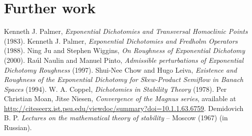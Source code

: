 \documentclass[12pt]{article} %
\theoremstyle{remark}
\begin{document}
\section{Further work}
\begin{thebibliography}{9}
	Kenneth J. Palmer, {\em Exponential Dichotomies and Transversal Homoclinic Points} (1983).
	Kenneth J. Palmer, {\em Exponential Dichotomies and Fredholm Operators} (1988).
	Ning Ju and Stephen Wiggins, {\em On Roughness of Exponential Dichotomy} (2000).
	Ra\'ul Naulin and Manuel Pinto, {\em Admissible perturbations of Exponential Dichotomy Roughness} (1997).
	Shui-Nee Chow and Hugo Leiva, {\em Existence and Roughness of the Exponential Dichotomy for Skew-Product Semiflow in Banach Spaces} (1994).
	W. A. Coppel, {\em Dichotomies in Stability Theory} (1978).
	Per Christian Moan, Jitse Niesen, {\em Convergence of the Magnus series}, available at
	\url{http://citeseerx.ist.psu.edu/viewdoc/summary?doi=10.1.1.63.6759}.
Demidovich B. P. \emph{Lectures on the mathematical theory of stability} --
Moscow (1967) (in Russian).
\end{thebibliography}
\end{document}
